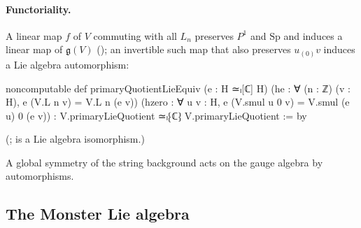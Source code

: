 \paragraph{Functoriality.}  A linear map $f$ of $V$ commuting with all $L_n$ preserves $P^1$ and $\mathrm{Sp}$ and induces
a linear map of $\mathfrak g(V)$ (); an invertible such map that also preserves $u_{(0)}v$
induces a Lie algebra automorphism:
\begin{leancode}
noncomputable def primaryQuotientLieEquiv (e : H ≃ₗ[ℂ] H)
    (he : ∀ (n : ℤ) (v : H), e (V.L n v) = V.L n (e v))
    (hzero : ∀ u v : H, e (V.smul u 0 v) = V.smul (e u) 0 (e v)) :
    V.primaryLieQuotient ≃ₗ⁅ℂ⁆ V.primaryLieQuotient := by
\end{leancode}
(;  is a Lie algebra isomorphism.)
\begin{physics}A global symmetry of the string background acts on the gauge algebra by automorphisms.\end{physics}

\subsection{The Monster Lie algebra}

